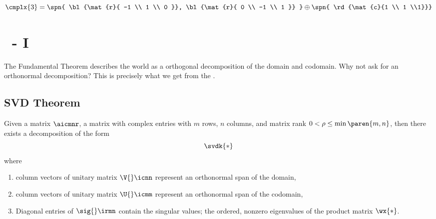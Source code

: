   \begin{equation*}   %
      \cmplx{3} = \spn { \bl{\mat{r}{ -1 \\ 1 \\ 0 }}, \bl{\mat{r}{ 0 \\ -1 \\ 1 }} } \oplus \spn { \rd{\mat{c}{1 \\ 1 \\1}}}
  \end{equation*}

\section{\bsvd\ - I}  %
The Fundamental Theorem describes the world as a orthogonal decomposition of the domain and codomain. Why not ask for an orthonormal decomposition? This is precisely what we get from the \asvd.

\subsection{SVD Theorem}  %
Given a matrix $\aicmnr$, a matrix with complex entries with $m$ rows, $n$ columns, and matrix rank $0<\rho\le\min\paren{m,n}$, then there exists a decomposition of the form
  \begin{equation*}   %
    \svdk{*}
  \end{equation*}
where
\begin{enumerate}
  \item column vectors of unitary matrix $\V{}\icnn$ represent an orthonormal span of the domain,
  \item column vectors of unitary matrix $\U{}\icmm$ represent an orthonormal span of the codomain,
  \item Diagonal entries of $\sig{}\irmn$ contain the singular values; the ordered, nonzero eigenvalues of the product matrix $\wx{*}$.
\end{enumerate}

